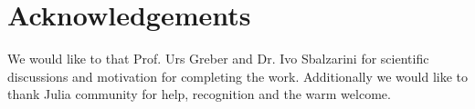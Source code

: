 \section*{Acknowledgements}
\label{} 

We would like to that Prof. Urs Greber and Dr. Ivo Sbalzarini for scientific discussions and motivation for completing the work. Additionally we would like to thank Julia community for help, recognition and the warm welcome.

  